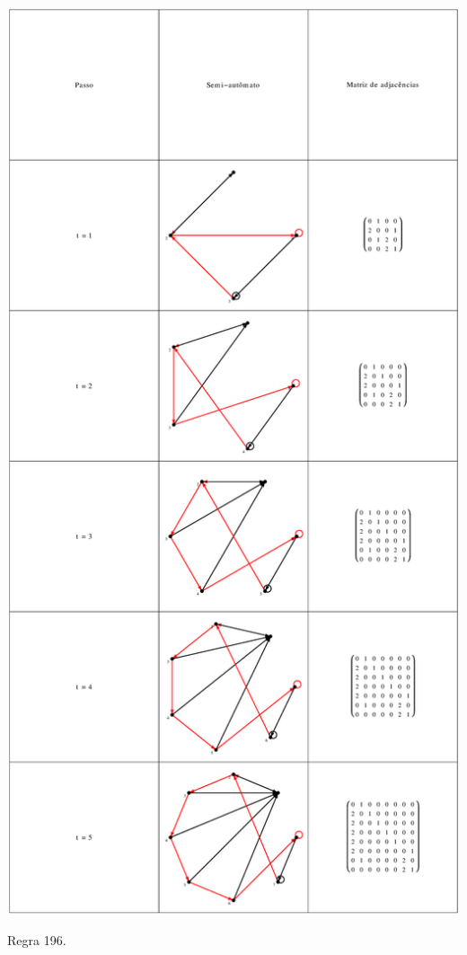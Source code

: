 \documentclass[12pt,a4paper]{article}
\begin{document}
\begin{table}[H]
\begin{center}
\includegraphics[scale=0.32]{img/mat/matr196.eps}
\caption{Regra 196.}
\label{tab:mr196}
\end{center}
\end{table}
\end{document}
